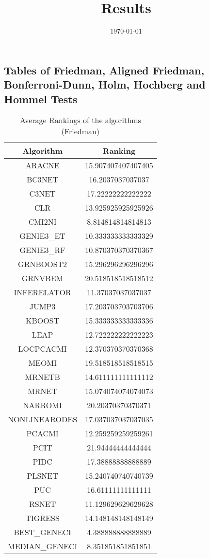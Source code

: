 \documentclass[a4paper,10pt]{article}
\title{Results}
\author{}
\date{\today}
\begin{document}
\begin{landscape}
\oddsidemargin 0in \topmargin 0in\maketitle
\section{Tables of Friedman, Aligned Friedman, Bonferroni-Dunn, Holm, Hochberg and Hommel Tests}
\begin{table}[!htp]
\centering
\caption{Average Rankings of the algorithms (Friedman)
}\begin{tabular}{c|c}
Algorithm&Ranking\\
\hline
ARACNE&15.907407407407405\\
BC3NET&16.2037037037037\\
C3NET&17.22222222222222\\
CLR&13.925925925925926\\
CMI2NI&8.814814814814813\\
GENIE3_ET&10.333333333333329\\
GENIE3_RF&10.870370370370367\\
GRNBOOST2&15.296296296296296\\
GRNVBEM&20.518518518518512\\
INFERELATOR&11.37037037037037\\
JUMP3&17.203703703703706\\
KBOOST&15.333333333333336\\
LEAP&12.722222222222223\\
LOCPCACMI&12.370370370370368\\
MEOMI&19.518518518518515\\
MRNETB&14.611111111111112\\
MRNET&15.074074074074073\\
NARROMI&20.20370370370371\\
NONLINEARODES&17.037037037037035\\
PCACMI&12.259259259259261\\
PCIT&21.94444444444444\\
PIDC&17.38888888888889\\
PLSNET&15.240740740740739\\
PUC&16.61111111111111\\
RSNET&11.129629629629628\\
TIGRESS&14.148148148148149\\
BEST_GENECI&4.388888888888889\\
MEDIAN_GENECI&8.351851851851851\\
\end{tabular}
\end{table}



\end{landscape}
\end{document}
